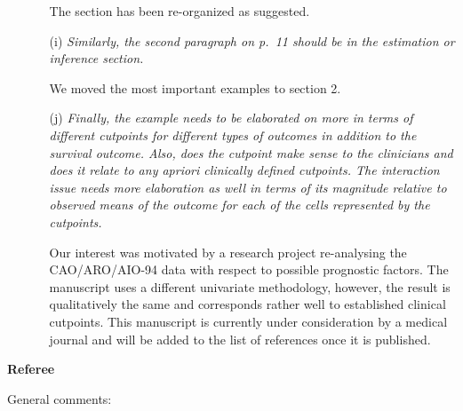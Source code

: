 \documentclass[11pt,a4paper]{article}
\begin{document}
\begin{enumerate}
\begin{itemize}
	       The section has been re-organized as suggested.
	       
    \item[(i)] \textit{Similarly, the second paragraph on p.~11 should be in the
               estimation or inference section.}
	       
	       We moved the most important examples to section 2.
	       
    \item[(j)] \textit{Finally, the example needs to be elaborated on more in terms
               of different cutpoints for different types of outcomes in addition to
	       the survival outcome. Also, does the cutpoint make sense to the
	       clinicians and does it relate to any apriori clinically defined
	       cutpoints. The interaction issue needs more elaboration as well in
	       terms of its magnitude relative to observed means of the outcome for
	       each of the cells represented by the cutpoints.}
	       
Our interest was motivated by a research project re-analysing the CAO/ARO/AIO-94
data with respect to possible prognostic factors. The manuscript uses 
a different univariate methodology, however, the result is qualitatively the same
and corresponds rather well to established clinical cutpoints. 
This manuscript is currently under consideration by a medical journal and will
be added to the list of references once it is published.

\end{itemize}
  
\end{enumerate}

\textbf{\large Referee}

General comments:
\end{document}
